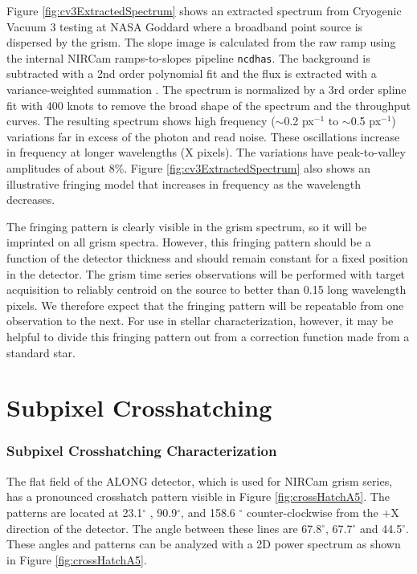 \documentclass[]{aastex62}
\newcommand{\degree}{^\circ}
\begin{document}
Figure \ref{fig:cv3ExtractedSpectrum} shows an extracted spectrum from Cryogenic Vacuum 3 testing at NASA Goddard where a broadband point source is dispersed by the grism.
The slope image is calculated from the raw ramp using the internal NIRCam ramps-to-slopes pipeline \texttt{ncdhas}.
The background is subtracted with a 2nd order polynomial fit and the flux is extracted with a variance-weighted summation \citep[e.g.][]{horne1986optimalE}.
The spectrum is normalized by a 3rd order spline fit with 400 knots to remove the broad shape of the spectrum and the throughput curves.
The resulting spectrum shows high frequency ($\sim$0.2 px$^{-1}$ to $\sim$0.5 px$^{-1}$) variations far in excess of the photon and read noise.
These oscillations increase in frequency at longer wavelengths (X pixels).
The variations have peak-to-valley amplitudes of about 8\%.
Figure \ref{fig:cv3ExtractedSpectrum} also shows an illustrative fringing model that increases in frequency as the wavelength decreases.

The fringing pattern is clearly visible in the grism spectrum, so it will be imprinted on all grism spectra.
However, this fringing pattern should be a function of the detector thickness and should remain constant for a fixed position in the detector.
The grism time series observations will be performed with target acquisition to reliably centroid on the source to better than 0.15 long wavelength pixels.
We therefore expect that the fringing pattern will be repeatable from one observation to the next.
For use in stellar characterization, however, it may be helpful to divide this fringing pattern out from a correction function made from a standard star.


\section{Subpixel Crosshatching}

\subsubsection{Subpixel Crosshatching Characterization}
The flat field of the ALONG detector, which is used for NIRCam grism series, has a pronounced crosshatch pattern visible in Figure \ref{fig:crossHatchA5}.
The patterns are located at 23.1$\degree$ , 90.9$\degree$, and 158.6 $\degree$ counter-clockwise from the $+$X direction of the detector.
The angle between these lines are 67.8$\degree$, 67.7$\degree$ and 44.5$\degree$.
These angles and patterns can be analyzed with a 2D power spectrum as shown in Figure \ref{fig:crossHatchA5}.
\end{document}
